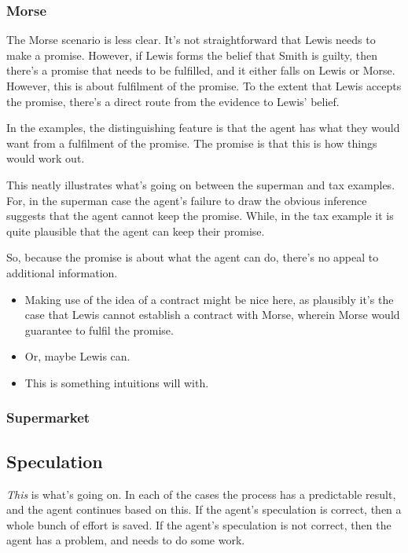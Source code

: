 \documentclass[10pt]{article}
\begin{document}
\subsubsection{Morse}
\label{sec:morse}



The Morse scenario is less clear.
It's not straightforward that Lewis needs to make a promise.
However, if Lewis forms the belief that Smith is guilty, then there's a promise that needs to be fulfilled, and it either falls on Lewis or Morse.
However, this is about fulfilment of the promise.
To the extent that Lewis accepts the promise, there's a direct route from the evidence to Lewis' belief.


In the examples, the distinguishing feature is that the agent has what they would want from a fulfilment of the promise.
The promise is that this is how things would work out.

This neatly illustrates what's going on between the superman and tax examples.
For, in the superman case the agent's failure to draw the obvious inference suggests that the agent cannot keep the promise.
While, in the tax example it is quite plausible that the agent can keep their promise.

So, because the promise is about what the agent can do, there's no appeal to additional information.

\begin{itemize}
\item Making use of the idea of a contract might be nice here, as plausibly it's the case that Lewis cannot establish a contract with Morse, wherein Morse would guarantee to fulfil the promise.
\item Or, maybe Lewis can.
\item This is something intuitions will with.
\end{itemize}

\subsubsection{Supermarket}
\label{sec:supermarket}





\subsection{Speculation}
\label{sec:speculation}

\emph{This} is what's going on.
In each of the cases the process has a predictable result, and the agent continues based on this.
If the agent's speculation is correct, then a whole bunch of effort is saved.
If the agent's speculation is not correct, then the agent has a problem, and needs to do some work.
\end{document}

